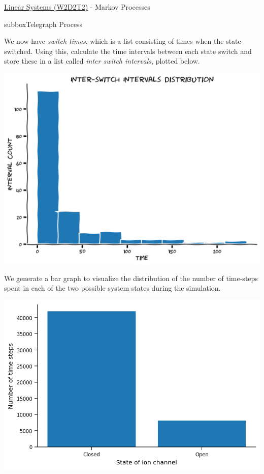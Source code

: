 \begin{textbox}{\href{https://colab.research.google.com/github/NeuromatchAcademy/course-content/blob/master/tutorials/W2D2_LinearSystems/student/W2D2_Tutorial2.ipynb}{Linear Systems (W2D2T2)} -  Markov Processes}
\begin{subbox}{subbox}{Telegraph Process}
\scriptsize

We now have \textit{switch times}, which is a list consisting of times when the state switched. Using this, calculate the time intervals between each state switch and store these in a list called \textit{inter switch intervals}, plotted below.

\begin{center}
    
\includegraphics[scale=0.2]{Figures/LS/MC_Figure2.png}
\end{center}

We generate a bar graph to visualize the distribution of the number of time-steps spent in each of the two possible system states during the simulation.
\begin{center}
\includegraphics[scale=0.2]{Figures/LS/MC_Figure3.png}
\end{center}


\end{subbox}
\end{textbox}
